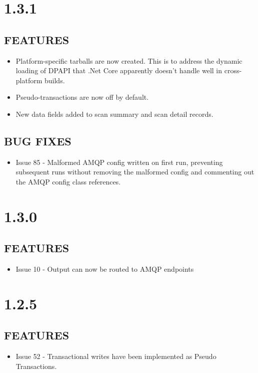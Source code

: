 \section{1.3.1}
\subsection*{FEATURES}
    \begin{itemize}
        \item Platform-specific tarballs are now created.  This is to address the dynamic loading of DPAPI that .Net Core apparently doesn't handle well in cross-platform builds.
        \item Pseudo-transactions are now off by default.
        \item New data fields added to scan summary and scan detail records.
    \end{itemize}

\subsection*{BUG FIXES}
    \begin{itemize}
        \item Issue 85 - Malformed AMQP config written on first run, preventing subsequent runs without removing the malformed config and commenting out the AMQP config class references.
    \end{itemize}


\section{1.3.0}
\subsection*{FEATURES}
    \begin{itemize}
        \item Issue 10 - Output can now be routed to AMQP endpoints
    \end{itemize}


\section{1.2.5}
\subsection*{FEATURES}
    \begin{itemize}
        \item Issue 52 - Transactional writes have been implemented as Pseudo Transactions.
    \end{itemize}

